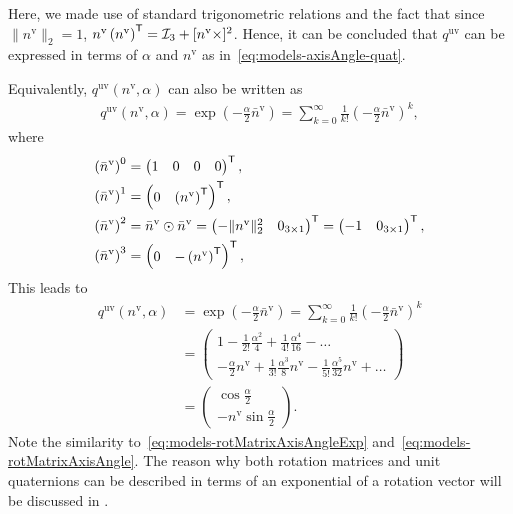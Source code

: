 Here, we made use of standard trigonometric relations and the fact that since $\| n^\text{v} \|_2= 1$, $n^\text{v} \left( n^\text{v} \right)^{\mathsf{T}} = \mathcal{I}_3 + [n^\text{v} \times]^2$. Hence, it can be concluded that $q^\text{uv}$ can be expressed in terms of $\alpha$ and $n^\text{v}$ as in~\eqref{eq:models-axisAngle-quat}.

Equivalently, $q^\text{uv}(n^\text{v},\alpha)$ can also be written as 
\begin{align}
q^\text{uv}(n^\text{v},\alpha) = \exp( - \tfrac{\alpha}{2} \bar n^\text{v} ) = \sum_{k = 0}^\infty \tfrac{1}{k!} \left( - \tfrac{\alpha}{2} \bar n^\text{v} \right)^k,
\end{align}
where 
\begin{subequations}
\begin{align}
\left( \bar n^\text{v} \right)^0 &= \begin{pmatrix} 1 & 0 & 0 & 0 \end{pmatrix}^{\mathsf{T}}, \\
\left( \bar n^\text{v} \right)^1 &= \begin{pmatrix} 0 & \left( n^\text{v} \right)^{\mathsf{T}} \end{pmatrix}^{\mathsf{T}}, \\
\left( \bar n^\text{v} \right)^2 &= \bar n^\text{v} \odot \bar n^\text{v} = \begin{pmatrix} - \| n^\text{v} \|_2^2 & 0_{3 \times 1} \end{pmatrix}^{\mathsf{T}} = \begin{pmatrix} - 1 & 0_{3 \times 1} \end{pmatrix}^{\mathsf{T}}, \\
\left( \bar n^\text{v} \right)^3 &= \begin{pmatrix} 0 & - \left( n^\text{v} \right)^{\mathsf{T}} \end{pmatrix}^{\mathsf{T}}, 
\end{align}
\end{subequations}
This leads to 
\begin{align}
\label{eq:models-quatAxisAngle}
q^\text{uv}(n^\text{v},\alpha) &= \exp( - \tfrac{\alpha}{2} \bar n^\text{v} ) = \sum_{k = 0}^\infty \tfrac{1}{k!} \left( - \tfrac{\alpha}{2} \bar n^\text{v} \right)^k \nonumber \\
&= \begin{pmatrix} 1 - \tfrac{1}{2!} \tfrac{\alpha^2}{4} + \tfrac{1}{4!} \tfrac{\alpha^4}{16} - \hdots \\
- \tfrac{\alpha}{2} n^\text{v} + \tfrac{1}{3!} \tfrac{\alpha^3}{8} n^\text{v} - \tfrac{1}{5!} \tfrac{\alpha^5}{32} n^\text{v} + \hdots
\end{pmatrix} \nonumber \\
&= \begin{pmatrix} \cos \tfrac{\alpha}{2} \\ - n^\text{v} \sin \tfrac{\alpha}{2}
\end{pmatrix}.
\end{align}
Note the similarity to~\eqref{eq:models-rotMatrixAxisAngleExp} and~\eqref{eq:models-rotMatrixAxisAngle}. The reason why both rotation matrices and unit quaternions can be described in terms of an exponential of a rotation vector will be discussed in .

